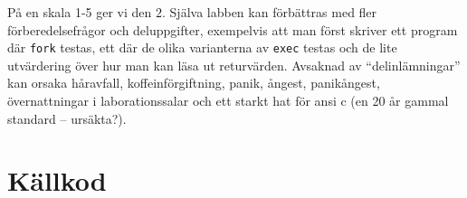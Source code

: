 \documentclass[a4paper,10pt,titlepage]{article}
\begin{document}
På en skala 1-5 ger vi den $2$. Själva labben kan förbättras med fler förberedelsefrågor och deluppgifter, exempelvis att man först skriver ett program där \verb!fork! testas, ett där de olika varianterna av \verb!exec! testas och de lite utvärdering över hur man kan läsa ut returvärden. Avsaknad av ``delinlämningar'' kan orsaka håravfall, koffeinförgiftning, panik, ångest, panikångest, övernattningar i laborationssalar och ett starkt hat för ansi c (en 20 år gammal standard -- ursäkta?).

\newpage
\section{Källkod}

\lstset{tabsize=2}
\footnotesize{}
\end{document}
